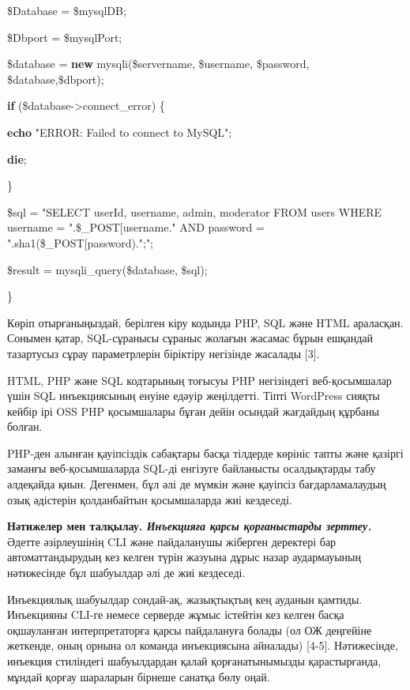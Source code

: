 \$Database = \$mysqlDB;

\$Dbport = \$mysqlPort;

\$database = {\bfseries new} mysqli(\$servername, \$username, \$password,
\$database,\$dbport);

{\bfseries if} (\$database-\textgreater connect\_error) \{

{\bfseries echo} "ERROR: Failed to connect to MySQL";

{\bfseries die};

\}

\$sql = "SELECT userId, username, admin, moderator FROM users WHERE
username =
\textquotesingle".\$\_POST{[}\textquotesingle username\textquotesingle{]}."\textquotesingle{}
AND password =
\textquotesingle".sha1(\$\_POST{[}\textquotesingle password\textquotesingle{]})."\textquotesingle;";

\$result = mysqli\_query(\$database, \$sql);

\}

Көріп отырғаныңыздай, берілген кіру кодында PHP, SQL және HTML
араласқан. Сонымен қатар, SQL-сұранысы сұраныс жолағын жасамас бұрын
ешқандай тазартусыз сұрау параметрлерін біріктіру негізінде жасалады
{[}3{]}.

HTML, PHP және SQL кодтарының тоғысуы PHP негізіндегі веб-қосымшалар
үшін SQL инъекциясының енуіне едәуір жеңілдетті. Тіпті WordPress сияқты
кейбір ірі OSS PHP қосымшалары бұған дейін осындай жағдайдың құрбаны
болған.

PHP-ден алынған қауіпсіздік сабақтары басқа тілдерде көрініс тапты және
қазіргі заманғы веб-қосымшаларда SQL-ді енгізуге байланысты осалдықтарды
табу әлдеқайда қиын. Дегенмен, бұл әлі де мүмкін және қауіпсіз
бағдарламалаудың озық әдістерін қолданбайтын қосымшаларда жиі кездеседі.

{\bfseries Нәтижелер мен талқылау. \emph{Инъекцияға қарсы қорғаныстарды
зерттеу.}} Әдетте әзірлеушінің CLI және пайдаланушы жіберген деректері
бар автоматтандырудың кез келген түрін жазуына дұрыс назар аудармауының
нәтижесінде бұл шабуылдар әлі де жиі кездеседі.

Инъекциялық шабуылдар сондай-ақ, жазықтықтың кең ауданын қамтиды.
Инъекцияны CLI-ге немесе серверде жұмыс істейтін кез келген басқа
оқшауланған интерпретаторға қарсы пайдалануға болады (ол ОЖ деңгейіне
жеткенде, оның орнына ол команда инъекциясына айналады) {[}4-5{]}.
Нәтижесінде, инъекция стиліндегі шабуылдардан қалай қорғанатынымызды
қарастырғанда, мұндай қорғау шараларын бірнеше санатқа бөлу оңай.

